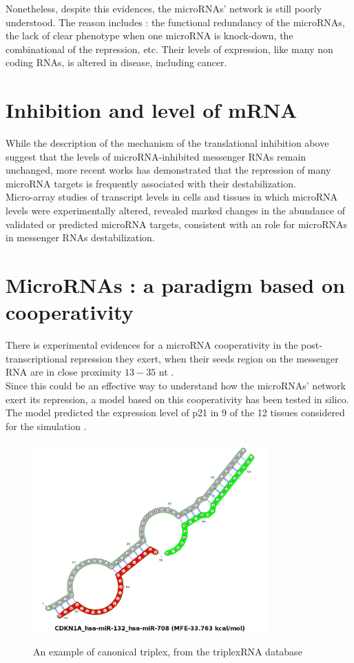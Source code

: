 \documentclass[a4paper,12pt]{report}
\begin{document}
Nonetheless, despite this evidences, the microRNAs' network is still poorly understood\cite{network,cancer}. The reason includes : the functional redundancy of the microRNAs, the lack of clear phenotype when one microRNA is knock-down, the combinational of the repression, etc\cite{network,cancer}. 
Their levels of expression, like many non coding RNAs, is altered in disease, including cancer\cite{cancer}.

\section{Inhibition and level of mRNA}

While the description of the mechanism of the translational inhibition above suggest that the levels of microRNA-inhibited messenger RNAs remain unchanged, more recent works has demonstrated that the repression of many microRNA targets is frequently associated with their destabilization\cite{cancer}.\\

Micro-array studies of transcript levels in cells and tissues
in which microRNA levels were experimentally altered, revealed marked changes in the abundance of validated or predicted microRNA targets, consistent with an role for microRNAs in messenger RNAs destabilization\cite{cancer}.

\section{MicroRNAs : a paradigm based on cooperativity}

There is experimental evidences for a microRNA cooperativity in the post-transcriptional repression they exert, when their seeds region on the messenger RNA are in close proximity $13\!- \!35$ nt \cite{site, coop}.\\

Since this could be an effective way to understand how the microRNAs' network exert its repression, a model based on this cooperativity has been tested in silico. The model predicted the expression level of p21 in 9 of the 12 tissues considered for the simulation \cite{p21}.
\begin{figure}[H]
	\centering
	{\includegraphics[width=0.8\textwidth]{canonical.png}}
	\caption{An example of canonical triplex, from the triplexRNA database}
\end{figure}
\end{document}

